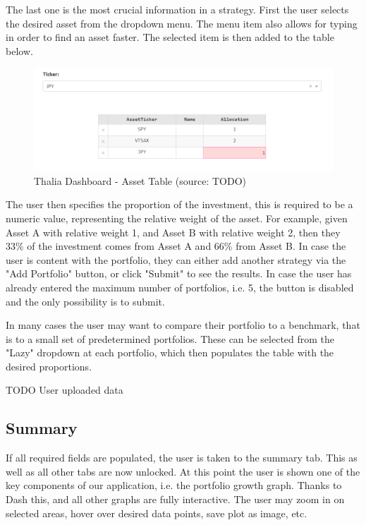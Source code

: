 \documentclass[main.tex]{subfiles}
\begin{document}
The last one is the most crucial information in a strategy. First the user selects the desired asset from the dropdown menu. The menu item also allows for typing in order to find an asset faster. The selected item is then added to the table below.

\begin{figure}[H]
   \centering
   \includegraphics[width=\textwidth]{10Appendices/081User/081Pictures/table.png}
   \caption{Thalia Dashboard - Asset Table (source: TODO)}
   \label{thalia_table}
\end{figure}

The user then specifies the proportion of the investment, this is required to be a numeric value, representing the relative weight of the asset. For example, given Asset A with relative weight 1, and Asset B with relative weight 2, then they 33\% of the investment comes from Asset A and 66\% from Asset B.
In case the user is content with the portfolio, they can either add another strategy via the "Add Portfolio" button, or click "Submit" to see the results. In case the user has already entered the maximum number of portfolios, i.e. 5, the button is disabled and the only possibility is to submit.

In many cases the user may want to compare their portfolio to a benchmark, that is to a small set of predetermined portfolios. These can be selected from the "Lazy" dropdown at each portfolio, which then populates the table with the desired proportions.

TODO User uploaded data

\subsection*{Summary}

If all required fields are populated, the user is taken to the summary tab. This as well as all other tabs are now unlocked. At this point the user is shown one of the key components of our application, i.e. the portfolio growth graph. Thanks to Dash this, and all other graphs are fully interactive. The user may zoom in on selected areas, hover over desired data points, save plot as image, etc.
\end{document}
